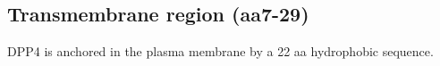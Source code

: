 \subsection{Transmembrane region (aa7-29)}

DPP4 is anchored in the plasma membrane by a 22 aa hydrophobic sequence. \cite{Hong_1990}